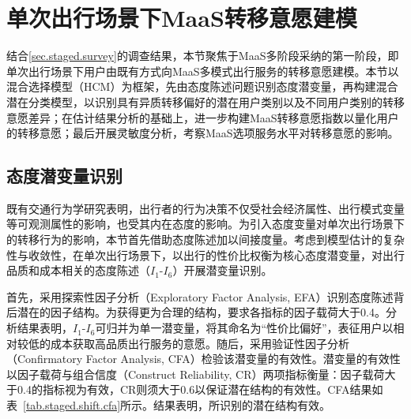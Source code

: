 \section{单次出行场景下MaaS转移意愿建模}\label{sec.staged.shift}

结合\ref{sec.staged.survey}的调查结果，本节聚焦于MaaS多阶段采纳的第一阶段，即单次出行场景下用户由既有方式向MaaS多模式出行服务的转移意愿建模。本节以混合选择模型（HCM）为框架，先由态度陈述问题识别态度潜变量，再构建混合潜在分类模型，以识别具有异质转移偏好的潜在用户类别以及不同用户类别的转移意愿差异；在估计结果分析的基础上，进一步构建MaaS转移意愿指数以量化用户的转移意愿；最后开展灵敏度分析，考察MaaS选项服务水平对转移意愿的影响。

\subsection{态度潜变量识别}\label{subsec.staged.shift.lv}

既有交通行为学研究表明，出行者的行为决策不仅受社会经济属性、出行模式变量等可观测属性的影响，也受其内在态度的影响\citep{panModelingEVCharging2019,huanUnderstandingEffectsTravel2022,vijHowWhenWhy2016,dalyUsingOrderedAttitudinal2012,yaoInvestigatingWillingnessShifting2024,kimInfluenceLatentLifestyle2022}。为引入态度变量对单次出行场景下的转移行为的影响，本节首先借助态度陈述加以间接度量\citep{panModelingEVCharging2019,huanUnderstandingEffectsTravel2022}。考虑到模型估计的复杂性与收敛性，在单次出行场景下，以出行的性价比权衡为核心态度潜变量，对出行品质和成本相关的态度陈述（$I_1$-$I_6$）开展潜变量识别。

首先，采用探索性因子分析（Exploratory Factor Analysis, EFA）识别态度陈述背后潜在的因子结构。为获得更为合理的结构，要求各指标的因子载荷大于0.4。分析结果表明，$I_1$-$I_6$可归并为单一潜变量，将其命名为``性价比偏好''，表征用户以相对较低的成本获取高品质出行服务的意愿。随后，采用验证性因子分析（Confirmatory Factor Analysis, CFA）检验该潜变量的有效性。潜变量的有效性以因子载荷与组合信度（Construct Reliability, CR）两项指标衡量：因子载荷大于0.4的指标视为有效，CR则须大于0.6以保证潜在结构的有效性。CFA结果如表~\ref{tab.staged.shift.cfa}所示。结果表明，所识别的潜在结构有效。

